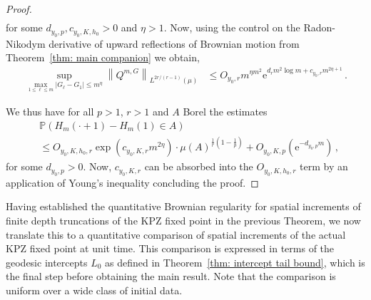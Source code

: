 \documentclass[11pt, reqno]{amsart}
\numberwithin{equation}{section}
\newcommand{\PP}{\ensuremath{\mathbb{P}}}
\newcommand{\norm}[1]{\left\lVert#1\right\rVert}
\begin{document}
\begin{proof}
\begin{equation*}
\begin{array}{ll}
    \end{array}
\end{equation*}
for some $d_{y_0, p}, c_{y_0, K, h_0} >0$ and $\eta > 1$. Now, using the control on the Radon-Nikodym  derivative of upward reflections of Brownian motion from Theorem~\ref{thm: main companion} we obtain, 
 \begin{equation*}
     \begin{array}{cc}
         \displaystyle\sup_{\displaystyle\max_{1\le \ell \le m}|G_\ell - G_1| \le m^\eta}\norm{Q^{m, G}}_{L^{2r/(r-1)}(\mu)} &\le O_{y_0, r}m^{\eta m^2} \mathrm{e}^{d_r m^2\log m + c_{y_0, r}m^{2\eta + 1}}\,.
    \end{array}
\end{equation*}

We thus have for all $p>1$, $r>1$ and $A$ Borel the estimates
\begin{equation*}
    \begin{array}{ll}
        &\PP \left( H_m(\cdot + 1)-H_m(1)\in A \right)\\
        & \le O_{y_0, K, h_0, r}\exp\left(c_{y_0, K, r} m^{2\eta}\right) \cdot \mu(A)^{\frac{1}{r}(1-\frac{1}{p})}+ O_{y_0, K, p}(\mathrm{e}^{-d_{y_0, p} m})\,,
    \end{array}
\end{equation*}
for some $d_{y_0, p}> 0$. Now, $c_{y_0, K, r}$ can be absorbed into the $O_{y_0, K, h_0, r}$ term by an application of Young's inequality concluding the proof.
\end{proof}

Having established the quantitative Brownian regularity for spatial increments of finite depth truncations of the KPZ fixed point in the previous Theorem, we now translate this to a quantitative comparison of spatial increments of the actual KPZ fixed point at unit time. This comparison is expressed in terms of the geodesic intercepts $L_0$ as defined in Theorem~\ref{thm: intercept tail bound}, which is the final step before obtaining the main result. Note that the comparison is uniform over a wide class of initial data. 
\end{document}
